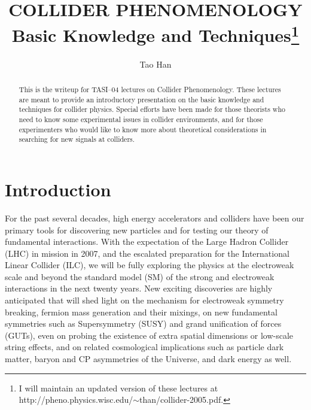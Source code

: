 \documentclass[12pt,prd,aps,floats,preprintnumbers,preprint,superscriptaddress,floatfix,nofootinbib]{revtex4}
\begin{document}
\vskip 1cm

\title{COLLIDER PHENOMENOLOGY\\
Basic Knowledge and Techniques\footnote{I will maintain an updated 
version of these lectures at http://pheno.physics.wisc.edu/$\sim$than/collider-2005.pdf.}}

\author{ Tao Han }


\begin{abstract}
This is the writeup for TASI--04 lectures on Collider Phenomenology.
These lectures are meant to provide an introductory  presentation 
on the basic knowledge and techniques for collider physics.
Special efforts have been made  for  those 
theorists who need to know some experimental  issues in 
collider environments, 
and for those experimenters who would like to know more about 
theoretical considerations in searching for new signals at colliders. 
\end{abstract}

\maketitle


\tableofcontents

\section{Introduction}

For the past several decades, high energy accelerators and colliders 
have been our primary tools for discovering new particles and for testing 
our theory of fundamental interactions. With the
expectation of the Large Hadron Collider (LHC) in mission in 2007,
and the escalated preparation for the International Linear Collider (ILC),
we will be fully exploring the physics at the electroweak scale and beyond
the standard model (SM) of the strong and electroweak interactions 
in the next twenty years. New exciting discoveries are highly anticipated 
that will shed light on the mechanism for electroweak symmetry breaking,
fermion mass generation and their mixings, on new fundamental symmetries 
such as Supersymmetry (SUSY) and grand unification of forces (GUTs),
even on probing the existence of extra spatial dimensions
or low-scale string effects, and on related cosmological implications
such as particle dark matter, baryon and CP asymmetries of the
Universe, and dark energy as well.
\end{document}

